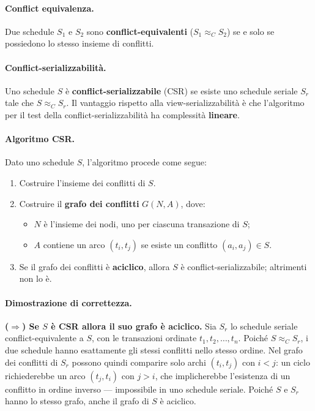 \paragraph{Conflict equivalenza.}
Due schedule $S_1$ e $S_2$ sono \textbf{conflict-equivalenti} ($S_1 \approx_C S_2$) se e solo se possiedono lo stesso insieme di conflitti.
\paragraph{Conflict-serializzabilità.}

Uno schedule $S$ è \textbf{conflict-serializzabile} (CSR) se esiste uno schedule seriale $S_r$ tale che $S \approx_C S_r$. Il vantaggio rispetto alla view-serializzabilità è che l'algoritmo per il test della conflict-serializzabilità ha complessità \textbf{lineare}.

\paragraph{Algoritmo CSR.}

Dato uno schedule $S$, l'algoritmo procede come segue:
\begin{enumerate}
	\item Costruire l'insieme dei conflitti di $S$.
	\item Costruire il \textbf{grafo dei conflitti} $G(N, A)$, dove:
	\begin{itemize}
		\item $N$ è l'insieme dei nodi, uno per ciascuna transazione di $S$;
		\item $A$ contiene un arco $(t_i, t_j)$ se esiste un conflitto $(a_i, a_j) \in S$.
	\end{itemize}
	\item Se il grafo dei conflitti è \textbf{aciclico}, allora $S$ è conflict-serializzabile; altrimenti non lo è.
\end{enumerate}

\paragraph{Dimostrazione di correttezza.}

\textbf{($\Rightarrow$) Se $S$ è CSR allora il suo grafo è aciclico.}
Sia $S_r$ lo schedule seriale conflict-equivalente a $S$, con le transazioni ordinate $t_1, t_2, \ldots, t_n$. Poiché $S \approx_C S_r$, i due schedule hanno esattamente gli stessi conflitti nello stesso ordine. Nel grafo dei conflitti di $S_r$ possono quindi comparire solo archi $(t_i, t_j)$ con $i < j$: un ciclo richiederebbe un arco $(t_j, t_i)$ con $j > i$, che implicherebbe l'esistenza di un conflitto in ordine inverso — impossibile in uno schedule seriale. Poiché $S$ e $S_r$ hanno lo stesso grafo, anche il grafo di $S$ è aciclico.

